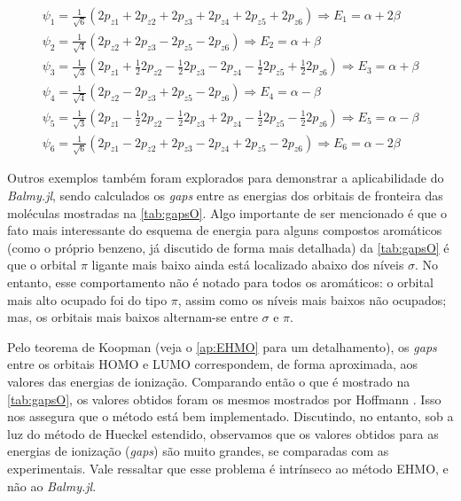 \begin{equation}
\label{wavefunctions}
\begin{split}
    \psi_1 = \frac{1}{\sqrt{6}}(2p_{z1} + 2p_{z2} + 2p_{z3} + 2p_{z4} + 2p_{z5} + 2p_{z6}) \Longrightarrow E_1 = \alpha + 2\beta \\[0.35cm]
    \psi_2 = \frac{1}{\sqrt{4}}(2p_{z2} + 2p_{z3} - 2p_{z5} - 2p_{z6}) \Longrightarrow E_2 = \alpha + \beta \\[0.35cm]
   \psi_3 = \frac{1}{\sqrt{3}}(2p_{z1} + \frac{1}{2} 2p_{z2} - \frac{1}{2} 2p_{z3} - 2p_{z4} - \frac{1}{2} 2p_{z5} + \frac{1}{2} 2p_{z6}) \Longrightarrow E_3 = \alpha + \beta \\[0.35cm]
     \psi_4 = \frac{1}{\sqrt{4}}(2p_{z2} - 2p_{z3} + 2p_{z5} - 2p_{z6}) \Longrightarrow E_4 = \alpha - \beta \\[0.35cm]
      \psi_5 = \frac{1}{\sqrt{3}}(2p_{z1} - \frac{1}{2} 2p_{z2} - \frac{1}{2} 2p_{z3} + 2p_{z4} - \frac{1}{2} 2p_{z5} - \frac{1}{2} 2p_{z6}) \Longrightarrow E_5 = \alpha - \beta \\[0.35cm]
      \psi_6 = \frac{1}{\sqrt{6}}(2p_{z1} - 2p_{z2} + 2p_{z3} - 2p_{z4} +  2p_{z5} -  2p_{z6}) \Longrightarrow E_6 = \alpha - 2\beta 
\end{split}
\end{equation}

Outros exemplos também foram explorados para demonstrar a aplicabilidade do \textit{Balmy.jl}, sendo calculados os \textit{gaps} entre as energias dos orbitais de fronteira das moléculas mostradas na \autoref{tab:gapsO}. Algo importante de ser mencionado é que o fato mais interessante do esquema de energia para alguns compostos aromáticos (como o próprio benzeno, já discutido de forma mais detalhada) da \autoref{tab:gapsO} é que o orbital $\pi$ ligante mais baixo ainda está localizado abaixo dos níveis $\sigma$. No entanto, esse comportamento não é notado para todos os aromáticos: o orbital mais alto ocupado foi do tipo $\pi$, assim como os níveis mais baixos não ocupados; mas, os orbitais mais baixos alternam-se entre $\sigma$ e $\pi$.

Pelo teorema de Koopman (veja o \autoref{ap:EHMO} para um detalhamento), os \textit{gaps} entre os orbitais \gls{HOMO} e \gls{LUMO} correspondem, de forma aproximada, aos valores das energias de ionização. Comparando então o que é mostrado na \autoref{tab:gapsO}, os valores obtidos foram os mesmos mostrados por Hoffmann \autocite{Hoffmann1963}. Isso nos assegura que o método está bem implementado. Discutindo, no entanto, sob a luz do método de Hueckel estendido, observamos que os valores obtidos para as energias de ionização (\textit{gaps}) são muito grandes, se comparadas com as experimentais. Vale ressaltar que esse problema é intrínseco ao método \gls{EHMO}, e não ao \textit{Balmy.jl}.

